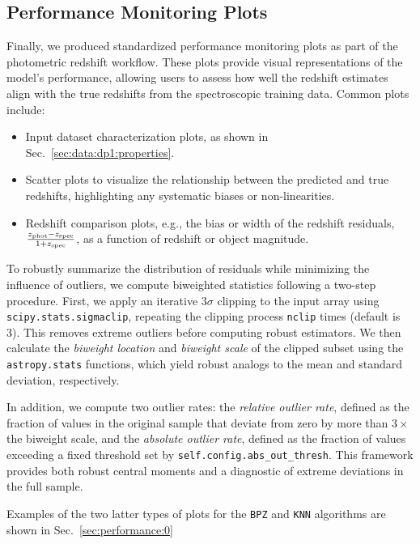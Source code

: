 \subsection{Performance Monitoring Plots}
\label{sec:products:peformance_plots}

Finally, we produced standardized performance monitoring plots as part of the photometric redshift workflow.  These plots provide visual representations of the model's performance, allowing users to assess how well the redshift estimates align with the true redshifts from the spectroscopic training data.  Common plots include:

\begin{itemize}
\item{Input dataset characterization plots, as shown in Sec.~\ref{sec:data:dp1:properties}.}
\item{Scatter plots to visualize the relationship between the predicted and true redshifts, highlighting any systematic biases or non-linearities.}
\item{Redshift comparison plots, e.g., the bias or width of the redshift residuals, $\frac{z_{\rm phot} - z_{\rm spec}}{1 + z_{\rm spec}}$, as a function of redshift or object magnitude.}
\end{itemize}

To robustly summarize the distribution of residuals while minimizing the influence of outliers, we compute biweighted statistics following a two-step procedure. First, we apply an iterative $3\sigma$ clipping to the input array using \texttt{scipy.stats.sigmaclip}, repeating the clipping process \texttt{nclip} times (default is 3). This removes extreme outliers before computing robust estimators. We then calculate the \textit{biweight location} and \textit{biweight scale} of the clipped subset using the \texttt{astropy.stats} functions, which yield robust analogs to the mean and standard deviation, respectively. 

In addition, we compute two outlier rates: the \textit{relative outlier rate}, defined as the fraction of values in the original sample that deviate from zero by more than $3\times$ the biweight scale, and the \textit{absolute outlier rate}, defined as the fraction of values exceeding a fixed threshold set by \texttt{self.config.abs\_out\_thresh}. This framework provides both robust central moments and a diagnostic of extreme deviations in the full sample.

Examples of the two latter types of plots for the \texttt{BPZ} and \texttt{KNN} algorithms are shown in Sec.~\ref{sec:performance:0}


